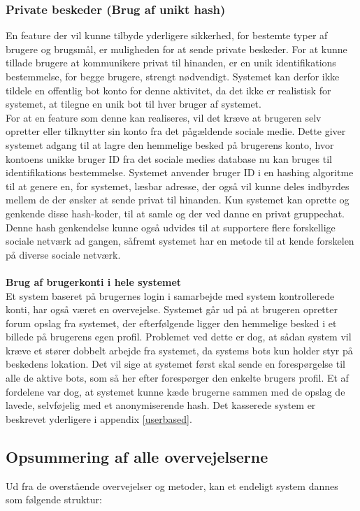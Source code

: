 \subsubsection{Private beskeder (Brug af unikt hash)}
\label{privatbesked}
En feature der vil kunne tilbyde yderligere sikkerhed, for bestemte typer af brugere og brugsmål, er muligheden for at sende private beskeder. For at kunne tillade brugere at kommunikere privat til hinanden, er en unik identifikations bestemmelse, for begge brugere, strengt nødvendigt. Systemet kan derfor ikke tildele en offentlig bot konto for denne aktivitet, da det ikke er realistisk for systemet, at tilegne en unik bot til hver bruger af systemet.\\
For at en feature som denne kan realiseres, vil det kræve at brugeren selv opretter eller tilknytter sin konto fra det pågældende sociale medie. Dette giver systemet adgang til at lagre den hemmelige besked på brugerens konto, hvor kontoens unikke bruger ID fra det sociale medies database nu kan bruges til identifikations bestemmelse. Systemet anvender bruger ID i en hashing algoritme til at genere en, for systemet, læsbar adresse, der også vil kunne deles indbyrdes mellem de der ønsker at sende privat til hinanden. Kun systemet kan oprette og genkende disse hash-koder, til at samle og der ved danne en privat gruppechat. Denne hash genkendelse kunne også udvides til at supportere flere forskellige sociale netværk ad gangen, såfremt systemet har en metode til at kende forskelen på diverse sociale netværk.
\\\\
\textbf{Brug af brugerkonti i hele systemet}\\
Et system baseret på brugernes login i samarbejde med system kontrollerede konti, har også været en overvejelse. Systemet går ud på at brugeren opretter forum opslag fra systemet, der efterfølgende ligger den hemmelige besked i et billede på brugerens egen profil. Problemet ved dette er dog, at sådan system vil kræve et stører dobbelt arbejde fra systemet, da systems bots kun holder styr på beskedens lokation. Det vil sige at systemet først skal sende en forespørgelse til alle de aktive bots, som så her efter forespørger den enkelte brugers profil. Et af fordelene var dog, at systemet kunne kæde brugerne sammen med de opslag de lavede, selvføjelig med et anonymiserende hash. Det kasserede system er beskrevet yderligere i appendix \ref{userbased}.

\subsection{Opsummering af alle overvejelserne}
\label{Opsummering_Overvejelserne}
Ud fra de overstående overvejelser og metoder, kan et endeligt system dannes som følgende struktur:


